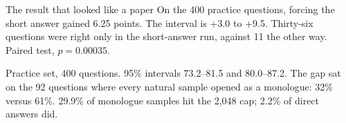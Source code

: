 \documentclass[aspectratio=169,11pt]{beamer}
\newcommand{\src}[1]{\par\vfill\begin{minipage}{0.96\textwidth}\color{muted}\tiny #1\end{minipage}\vspace{-0.2em}}
\begin{document}
\begin{frame}{The result that looked like a paper}
  On the 400 practice questions, forcing the short answer gained 6.25 points.
  The interval is +3.0 to +9.5. Thirty-six questions were right only in the short-answer
  run, against 11 the other way. Paired test, $p = 0.00035$.
  \vspace{0.15em}
  \begin{center}
  \end{center}
  \src{Practice set, 400 questions. 95\% intervals 73.2--81.5 and 80.0--87.2.
  The gap sat on the 92 questions where every natural sample opened as a monologue: 32\% versus 61\%.
  29.9\% of monologue samples hit the 2{,}048 cap; 2.2\% of direct answers did.}
\end{frame}
\end{document}
